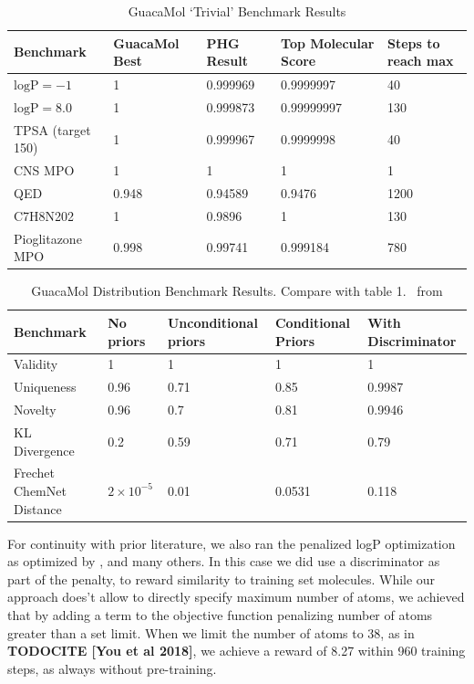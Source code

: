 \documentclass{article}
\newcommand{\CITE}[1]{{\bf TODOCITE [#1]}}
\begin{document}
\begin{table}
    \caption{GuacaMol `Trivial' Benchmark Results}
    \label{tab:guac-trivial}
    \centering
    \begin{tabular}{lllll}
        \toprule
        Benchmark & GuacaMol Best & PHG Result & Top Molecular Score & Steps to reach max \\
        \midrule
        $\text{logP} = -1$ & 1 & 0.999969 & 0.9999997 & 40 \\
        $\text{logP} = 8.0$ & 1 & 0.999873 & 0.99999997 & 130 \\
        TPSA (target 150) & 1 & 0.999967 & 0.9999998 & 40 \\
        CNS MPO & 1 & 1 & 1 & 1 \\
        QED & 0.948 & 0.94589 & 0.9476 & 1200 \\
        C7H8N202 & 1 & 0.9896 & 1 & 130 \\
        Pioglitazone MPO & 0.998 & 0.99741 & 0.999184 & 780 \\
        \bottomrule
    \end{tabular}
\end{table}

\begin{table}
    \caption{GuacaMol Distribution Benchmark Results. Compare with table 1.~ from \cite{brown2019}}
    \label{tab:guac-dist}
    \centering
    \begin{tabular}{lllll}
        \toprule
        Benchmark & No priors & Unconditional priors & Conditional Priors & With Discriminator \\
        \midrule
        Validity & 1 & 1 & 1 & 1 \\
        Uniqueness & 0.96 & 0.71 & 0.85 & 0.9987 \\
        Novelty & 0.96 & 0.7 & 0.81 & 0.9946 \\
        KL Divergence & 0.2 & 0.59 & 0.71 & 0.79 \\
        Frechet ChemNet Distance & $2 \times 10^{-5}$ & 0.01 & 0.0531 & 0.118 \\
        \bottomrule
    \end{tabular}
\end{table}

For continuity with prior literature, we also ran the penalized logP optimization as optimized by \cite{kusner2017, you2018}, and many others. In this case we did use a discriminator as part of the penalty, to reward similarity to training set molecules. While our approach does't allow to directly specify maximum number of atoms, we achieved that by adding a term to the objective function penalizing number of atoms greater than a set limit. When we limit the number of atoms to 38, as in \CITE{You et al 2018}, we achieve a reward of 8.27 within 960 training steps, as always without pre-training.
\end{document}
